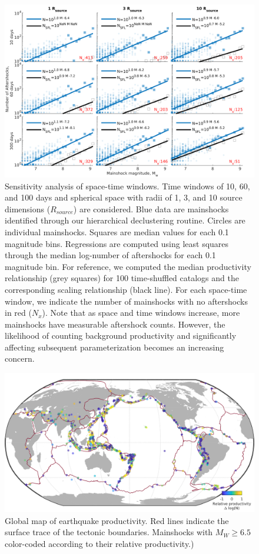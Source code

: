 \documentclass[draft]{agujournal}
\begin{document}
\begin{figure}
\centering
\includegraphics{figures/sensitivity_mw5.png}
\caption{Sensitivity analysis of space-time windows. Time windows of 10, 60, and 100 days and spherical space with radii of 1, 3, and 10 source dimensions ($R_{source}$) are considered. Blue data are mainshocks identified through our hierarchical declustering routine. Circles are individual mainshocks. Squares are median values for each 0.1 magnitude bins. Regressions are computed using least squares through the median log-number of aftershocks for each 0.1 magnitude bin. For reference, we computed the median productivity relationship (grey squares) for 100 time-shuffled catalogs and the corresponding scaling relationship (black line). For each space-time window, we indicate the number of mainshocks with no aftershocks in red ($N_x$). Note that as space and time windows increase, more mainshocks have measurable aftershock counts. However, the likelihood of counting background productivity and significantly affecting subsequent parameterization becomes an increasing concern.}
\label{fig:sensitivity}
\end{figure} 

\begin{figure}
\includegraphics{figures/worldmap_res_mw5.png}
\caption{Global map of earthquake productivity. Red lines indicate the surface trace of the tectonic boundaries. Mainshocks with $M_W\ge6.5$ color-coded according to their relative productivity.)
} 
\label{fig:global_res}
\end{figure}
\end{document}
